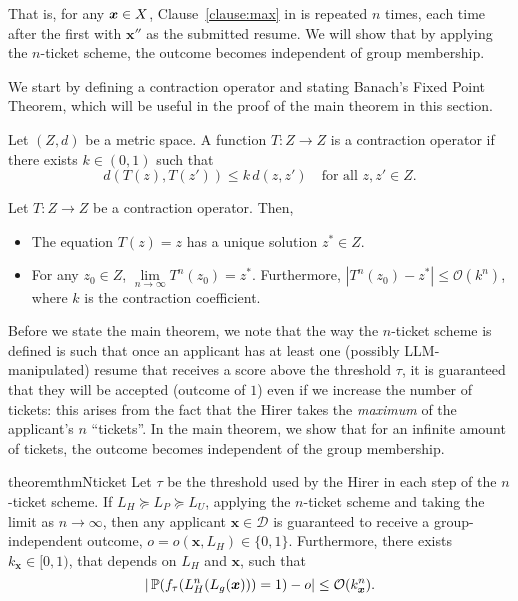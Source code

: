 That is, for any $\bm x\in \mathbb \mathcal{X}$, Clause~\ref{clause:max} in  is repeated $n$ times, each time after the first with $\bm{x}''$ as the submitted resume. We will show that by applying the $n$-ticket scheme, the outcome becomes independent of group membership.

We start by defining a contraction operator and stating Banach's Fixed Point Theorem, which will be useful in the proof of the main theorem in this section.
\begin{definition}
Let $(Z,d)$ be a metric space. A function $T:Z\rightarrow Z$ is a contraction operator if there exists $k\in(0,1)$ such that
\[
d(T(z), T(z')) \leq k \, d(z, z') \quad \text{for all } z,z' \in Z.
\]
\end{definition}

\begin{theorem}  Let $T:Z\rightarrow Z$ be a contraction 
operator. Then,
\begin{itemize}
\item The equation $T(z) = z$ has a unique solution $z^* \in Z$.
\item For any $z_0 \in Z$, $\lim\limits_{n \to \infty} T^n(z_0) = z^*$. Furthermore, $|T^n(z_0) - z^*| \leq \mathcal{O}(k^n)$, where $k$ is the contraction coefficient. 
\end{itemize}
\end{theorem}


Before we state the main theorem, we note that the way the $n$-ticket scheme is defined is such that once an applicant has at least one (possibly LLM-manipulated) resume that receives a score above the threshold $\tau$, it is guaranteed that they will be accepted (outcome of $1$) even if we increase the number of tickets: this arises from the fact that the Hirer takes the \textit{maximum} of the applicant's $n$ ``tickets''. In the main theorem, we show that for an infinite amount of tickets, the outcome becomes independent of the group membership. 
\begin{restatable}{theorem}{thmNticket}
    \label{thm: n-ticket}
    Let $\tau$ be the threshold used by the Hirer in each step of the $n$-ticket scheme. If $L_H \succeq L_P \succeq L_U$, applying the $n$-ticket scheme and taking the limit as $n \to \infty$, then any applicant $\bm{x} \in \mathcal{D}$ is guaranteed to receive a group-independent outcome, $o = o(\bm{x},L_H) \in \{0,1\}$.  
Furthermore, there exists $k_{\bm x} \in [0,1)$, that depends on $L_H$ and $\bm{x}$, such that  
$$|\operatorname*{\mathbb{P}}(f_\tau(L_H^{n}(L_g(\bm{x}))) = 1)- o| \leq \mathcal{O}(k_{\bm x}^n).$$
\end{restatable}
 

